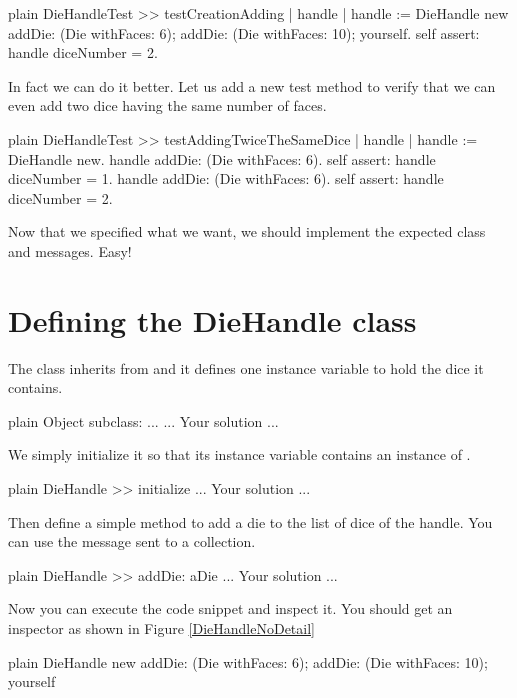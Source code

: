 \documentclass[10pt,twoside,english]{_support/latex/sbabook/sbabook}
\begin{document}
\begin{displaycode}{plain}
DieHandleTest >> testCreationAdding
	| handle |
	handle := DieHandle new 
			addDie: (Die withFaces: 6);
			addDie: (Die withFaces: 10);
			yourself.
	self assert: handle diceNumber = 2.
\end{displaycode}

In fact we can do it better. Let us add a new test method to verify that we can even add
two dice having the same number of faces. 

\begin{displaycode}{plain}
DieHandleTest >> testAddingTwiceTheSameDice
	| handle |
	handle := DieHandle new. 
	handle addDie: (Die withFaces: 6).
	self assert: handle diceNumber = 1.
	handle addDie: (Die withFaces: 6).
	self assert: handle diceNumber = 2.
\end{displaycode}

Now that we specified what we want, we should implement the expected class and messages. 
Easy!
\section{Defining the DieHandle class}
The class  inherits from  and it defines one instance variable to hold the dice it contains. 

\begin{displaycode}{plain}
Object subclass: ...
	... Your solution ...
\end{displaycode}

We simply initialize it so that its instance variable  contains an instance of .

\begin{displaycode}{plain}
DieHandle >> initialize
	... Your solution ...
\end{displaycode}

Then define a simple method  to add a die to the list of dice of the handle. You can use the message  sent to a collection.

\begin{displaycode}{plain}
DieHandle >> addDie: aDie 
	... Your solution ...
\end{displaycode}

Now you can execute the code snippet and inspect it. You should get an inspector as shown in Figure \ref{DieHandleNoDetail} 

\begin{displaycode}{plain}
DieHandle new 
	addDie: (Die withFaces: 6);
	addDie: (Die withFaces: 10);
	yourself
\end{displaycode}
\end{document}
